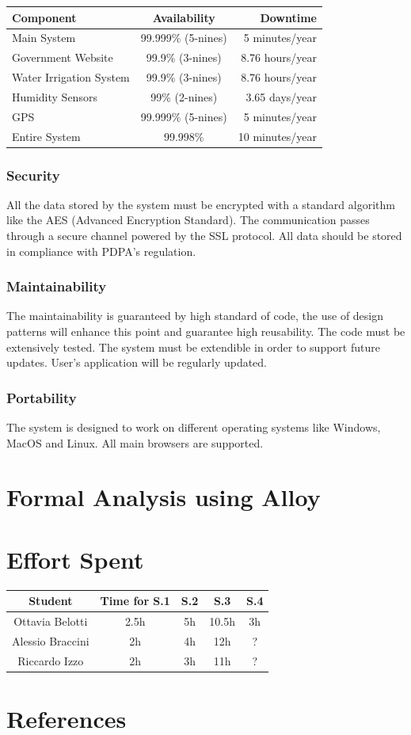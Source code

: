 \documentclass[table, 12pt]{article}
\begin{document}
\begin{table}[H]
    \begin{center}
      \label{tab:availability}
      \begin{tabular}{l|c|r}
        \textbf{Component} & \textbf{Availability} & \textbf{Downtime}\\
        \hline
        Main System & 99.999\% (5-nines) & 5 minutes/year\\
        Government Website & 99.9\% (3-nines) & 8.76 hours/year\\
        Water Irrigation System & 99.9\% (3-nines) & 8.76 hours/year\\
        Humidity Sensors & 99\% (2-nines) & 3.65 days/year\\
        GPS & 99.999\% (5-nines) & 5 minutes/year\\
        \hline
        Entire System & 99.998\% & 10 minutes/year
      \end{tabular}
    \end{center}
\end{table}

\subsubsection{Security}
All the data stored by the system must be encrypted with a standard algorithm like the AES (Advanced Encryption Standard).
The communication passes through a secure channel powered by the SSL protocol.
All data should be stored in compliance with PDPA's regulation.
\subsubsection{Maintainability}
The maintainability is guaranteed by high standard of code, the use of design patterns will enhance this point and guarantee high reusability.
The code must be extensively tested.
The system must be extendible in order to support future updates.
User's application will be regularly updated.
\subsubsection{Portability}
The system is designed to work on different operating systems like Windows, MacOS and Linux.
All main browsers are supported.
\newpage
\section{Formal Analysis using Alloy}
\section{Effort Spent}
    \begin{tabular}{| c || c | c| c| c |}
        \hline
        Student & Time for S.1 & S.2 & S.3 & S.4 \\ \hline
        Ottavia Belotti & 2.5h & 5h & 10.5h & 3h \\
        Alessio Braccini & 2h & 4h & 12h & ? \\
        Riccardo Izzo & 2h & 3h & 11h & ? \\
        \hline
    \end{tabular}

\section{References}
\end{document}
